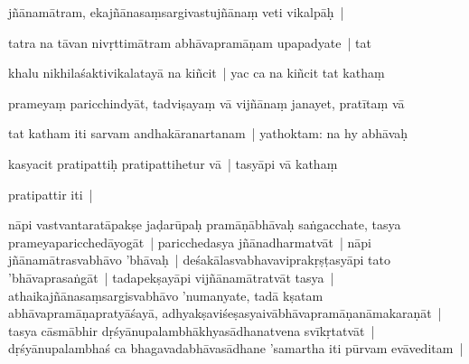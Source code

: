 \documentclass[article,12pt,a4paper]{memoir}%
\newcounter{parCount}
\begin{document}
	  
	  \pstart \leavevmode%
	jñānamātram, ekajñānasaṃsargivastujñānaṃ veti vikalpāḥ | 
	{}
	\pend%
      

	  
	  \pstart \leavevmode%
	\label{thakur75-28.22}tatra na tāvan nivṛttimātram abhāvapramāṇam upapadyate | tat 
	{}
	\pend%
      

	  
	  \pstart \leavevmode%
	khalu nikhilaśaktivikalatayā na kiñcit | yac ca na kiñcit tat kathaṃ 
	{}
	\pend%
      

	  
	  \pstart \leavevmode%
	prameyaṃ paricchindyāt, tadviṣayaṃ vā vijñānaṃ janayet, pratītaṃ vā 
	{}
	\pend%
      

	  
	  \pstart \leavevmode%
	tat katham iti sarvam andhakāranartanam | yathoktam: na hy abhāvaḥ 
	{}
	\pend%
      

	  
	  \pstart \leavevmode%
	kasyacit pratipattiḥ pratipattihetur vā | tasyāpi vā kathaṃ 
	{}
	\pend%
      

	  
	  \pstart \leavevmode%
	pratipattir  iti |
	{}
	\pend%
      

	  
	  \pstart \leavevmode%
	\label{thakur75-28.27}nāpi vastvantaratāpakṣe jaḍarūpaḥ pramāṇābhāvaḥ saṅgacchate, tasya prameyaparicchedāyogāt | paricchedasya jñānadharmatvāt | nāpi jñānamātrasvabhāvo 'bhāvaḥ | deśakālasvabhavaviprakṛṣṭasyāpi tato 'bhāvaprasaṅgāt | tadapekṣayāpi vijñānamātratvāt tasya | athaikajñānasaṃsargisvabhāvo 'numanyate, tadā kṣatam abhāvapramāṇapratyāśayā, adhyakṣaviśeṣasyaivābhāvapramāṇanāmakaraṇāt | tasya cāsmābhir dṛśyānupalambhākhyasādhanatvena svīkṛtatvāt | dṛśyānupalambhaś ca bhagavadabhāvasādhane 'samartha iti pūrvam evāveditam | 
	{}
	\pend%
      
\end{document}
